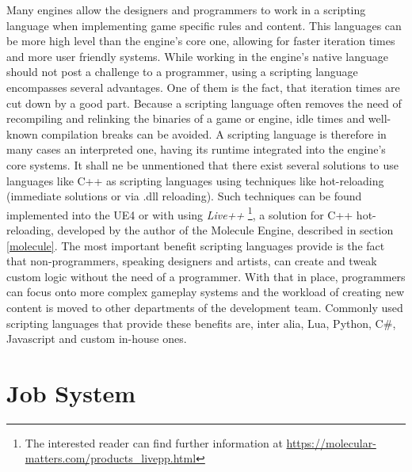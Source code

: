 Many engines allow the designers and programmers to work in a scripting language when implementing game specific rules and content. This languages can be more high level than the engine's core one, allowing for faster iteration times and more user friendly systems. While working in the engine's native language should not post a challenge to a programmer, using a scripting language encompasses several advantages. One of them is the fact, that iteration times are cut down by a good part. Because a scripting language often removes the need of recompiling and relinking the binaries of a game or engine, idle times and well-known compilation breaks can be avoided. A scripting language is therefore in many cases an interpreted one, having its runtime integrated into the engine's core systems. It shall ne be unmentioned that there exist several solutions to use languages like C++ as scripting languages using techniques like hot-reloading (immediate solutions or via .dll reloading). Such techniques can be found implemented into the \ac{UE4} or with using \textit{Live++} \footnote{The interested reader can find further information at \url{https://molecular-matters.com/products_livepp.html}}, a solution for C++ hot-reloading, developed by the author of the Molecule Engine, described in section \ref{molecule}.
The most important benefit scripting languages provide is the fact that non-programmers, speaking designers and artists, can create and tweak custom logic without the need of a programmer. With that in place, programmers can focus onto more complex gameplay systems and the workload of creating new content is moved to other departments of the development team. Commonly used scripting languages that provide these benefits are, inter alia, Lua, Python, C\#, Javascript and custom in-house ones.

\section{Job System}

